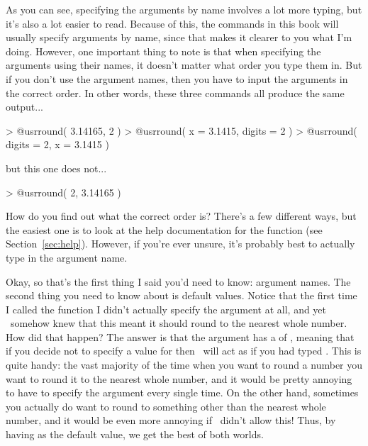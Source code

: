 As you can see, specifying the arguments by name involves a lot more typing, but it's also a lot easier to read. Because of this, the commands in this book will usually specify arguments by name,
 since that makes it clearer to you what I'm doing. However, one important thing to note is that when specifying the arguments using their names, it doesn't matter what order you type them in. But if you don't use the argument names, then you have to input the arguments in the correct order. In other words, these three commands all produce the same output...
\begin{rblock1}
> @usr{round( 3.14165, 2 )}
> @usr{round( x = 3.1415, digits = 2 )}
> @usr{round( digits = 2, x = 3.1415 )}
\end{rblock1}
but this one does not...
\begin{rblock1}
> @usr{round( 2, 3.14165 )}
\end{rblock1}
How do you find out what the correct order is? There's a few different ways, but the easiest one is to look at the help documentation for the function (see Section~\ref{sec:help}). However, if you're ever unsure, it's probably best to actually type in the argument name.


Okay, so that's the first thing I said you'd need to know: argument names. The second thing you need to know about is default values. Notice that the first time I called the  function I didn't actually specify the  argument at all, and yet \R\ somehow knew that this meant it should round to the nearest whole number. How did that happen? The answer is that the  argument has a  of , meaning that if you decide not to specify a value for  then \R\ will act as if you had typed . This is quite handy: the vast majority of the time when you want to round a number you want to round it to the nearest whole number, and it would be pretty annoying to have to specify the  argument every single time. On the other hand, sometimes you actually do want to round to something other than the nearest whole number, and it would be even more annoying if \R\ didn't allow this! Thus, by having  as the default value, we get the best of both worlds.


